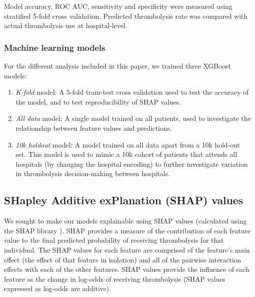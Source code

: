 Model accuracy, ROC AUC, sensitivity and specificity were measured using stratified 5-fold cross validation. Predicted thrombolysis rate was compared with actual thrombolysis use at hospital-level.


\subsubsection{Machine learning models}

For the different analysis included in this paper, we trained three XGBoost models:
\begin{enumerate}
    \item \emph{K-fold} model: A 5-fold train-test cross validation used to test the accuracy of the model, and to test reproducibility of SHAP values.
       
    \item \emph{All data} model: A single model trained on all patients, used to investigate the relationship between feature values and predictions.
    
    \item \emph{10k holdout} model: A model trained on all data apart from a 10k hold-out set. This model is used to mimic a 10k cohort of patients that attends all hospitals (by changing the hospital encoding) to further investigate variation in thrombolysis decision-making between hospitals.
\end{enumerate}

\subsection{SHapley Additive exPlanation (SHAP) values}

We sought to make our models explainable using SHAP values (calculated using the SHAP library \cite{lundberg_unified_2017}). SHAP provides a measure of the contribution of each feature value to the final predicted probability of receiving thrombolysis for that individual. The SHAP values for each feature are comprised of the feature’s main effect (the effect of that feature in isolation) and all of the pairwise interaction effects with each of the other features. SHAP values provide the influence of each feature as the change in log-odds of receiving thrombolysis (SHAP values expressed as log-odds are additive).

